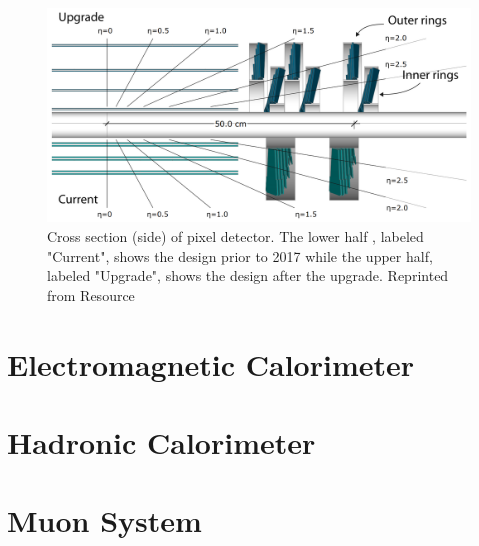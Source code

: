 \begin{figure}[h]
	\centering
	\includegraphics[width=0.7\linewidth]{Figures/Tracker_sideview}
	\caption{Cross section (side) of pixel detector. The lower half , labeled "Current", shows the design prior to 2017 while the upper half, labeled "Upgrade", shows the design after the upgrade. Reprinted from Resource \cite{Dominguez:1481838}}
	\label{fig:trackersideview}
\end{figure}





\section{Electromagnetic Calorimeter}

\section{Hadronic Calorimeter}

\section{Muon System}

